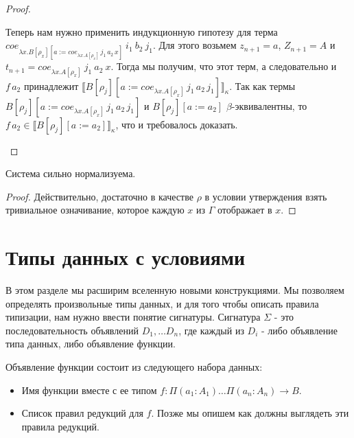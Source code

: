 \documentclass{amsart}
\theoremstyle{definition}
\theoremstyle{remark}
\renewcommand{\ll}{\llbracket}
\newcommand{\rr}{\rrbracket}
\numberwithin{figure}{section}
\begin{document}
\begin{proof}
\begin{itemize}
Теперь нам нужно применить индукционную гипотезу для терма $coe_{\lambda x. B[\rho_x][a := coe_{\lambda x. A[\rho_x]}\,j_1\,a_2\,x]}\ i_1\ b_2\ j_1$.
Для этого возьмем $z_{n+1} = a$, $Z_{n+1} = A$ и $t_{n+1} = coe_{\lambda x. A[\rho_x]}\ j_1\ a_2\ x$.
Тогда мы получим, что этот терм, а следовательно и $f\,a_2$ принадлежит $\ll B[\rho_j][a := coe_{\lambda x. A[\rho_x]}\,j_1\,a_2\,j_1] \rr_\kappa$.
Так как термы $B[\rho_j][a := coe_{\lambda x. A[\rho_x]}\,j_1\,a_2\,j_1]$ и $B[\rho_j][a := a_2]$ $\beta$-эквивалентны,
    то $f\,a_2 \in \ll B[\rho_j][a := a_2] \rr_\kappa$, что и требовалось доказать.

\end{itemize}
\end{proof}

\begin{cor}
Система сильно нормализуема.
\end{cor}
\begin{proof}
Действительно, достаточно в качестве $\rho$ в условии утверждения взять тривиальное означивание, которое каждую $x$ из $\Gamma$ отображает в $x$.
\end{proof}

\section{Типы данных с условиями}

В этом разделе мы расширим вселенную новыми конструкциями.
Мы позволяем определять произвольные типы данных, и для того чтобы описать правила типизации, нам нужно ввести понятие сигнатуры.
Сигнатура $\Sigma$ - это последовательность объявлений $D_1, \ldots D_n$, где каждый из $D_i$ - либо объявление типа данных, либо объявление функции.

Объявление функции состоит из следующего набора данных:
\begin{itemize}
\item Имя функции вместе с ее типом $f : \Pi (a_1 : A_1) \ldots \Pi (a_n : A_n) \to B$.
\item Список правил редукций для $f$. Позже мы опишем как должны выглядеть эти правила редукций.
\end{itemize}
\end{document}
